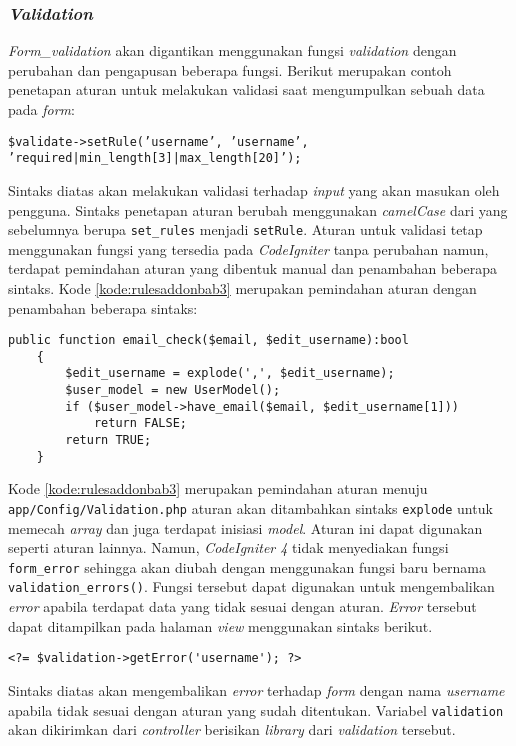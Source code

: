 \subsubsection{\textit{Validation}}
\textit{Form\_validation} akan digantikan menggunakan fungsi \textit{validation} dengan perubahan dan pengapusan beberapa fungsi. Berikut merupakan contoh penetapan aturan untuk melakukan validasi saat mengumpulkan sebuah data pada \textit{form}:
\begin{center}
\texttt{\$validate->setRule('username', 'username', 'required|min\_length[3]|max\_length[20]');}
\end{center}
Sintaks diatas akan melakukan validasi terhadap \textit{input} yang akan masukan oleh pengguna. Sintaks penetapan aturan berubah menggunakan \textit{camelCase} dari yang sebelumnya berupa \texttt{set\_rules} menjadi \texttt{setRule}. Aturan untuk validasi tetap menggunakan fungsi yang tersedia pada \textit{CodeIgniter} tanpa perubahan namun, terdapat pemindahan aturan yang dibentuk manual dan penambahan beberapa sintaks. Kode \ref{kode:rulesaddonbab3} merupakan pemindahan aturan dengan penambahan beberapa sintaks:
\begin{lstlisting}[caption=Contoh perubahan penambahan sintaks pada aturan yang dibentuk manual, label=kode:rulesaddonbab3]
		public function email_check($email, $edit_username):bool
	{
		$edit_username = explode(',', $edit_username);
        $user_model = new UserModel();
		if ($user_model->have_email($email, $edit_username[1]))
			return FALSE;
		return TRUE;
	}
\end{lstlisting}

Kode \ref{kode:rulesaddonbab3} merupakan pemindahan aturan menuju \texttt{app/Config/Validation.php} aturan akan ditambahkan sintaks \texttt{explode} untuk memecah \textit{array} dan juga terdapat inisiasi \textit{model}. Aturan ini dapat digunakan seperti aturan lainnya. Namun, \textit{CodeIgniter 4} tidak menyediakan fungsi \texttt{form\_error} sehingga akan diubah dengan menggunakan fungsi baru bernama \texttt{validation\_errors()}. Fungsi tersebut dapat digunakan untuk mengembalikan \textit{error} apabila terdapat data yang tidak sesuai dengan aturan. \textit{Error} tersebut dapat ditampilkan pada halaman \textit{view} menggunakan sintaks berikut.

\begin{center}
\verb|<?= $validation->getError('username'); ?>|
\end{center}

Sintaks diatas akan mengembalikan \textit{error} terhadap \textit{form} dengan nama \textit{username} apabila tidak sesuai dengan aturan yang sudah ditentukan. Variabel \texttt{validation} akan dikirimkan dari \textit{controller} berisikan \textit{library} dari \textit{validation} tersebut. 

